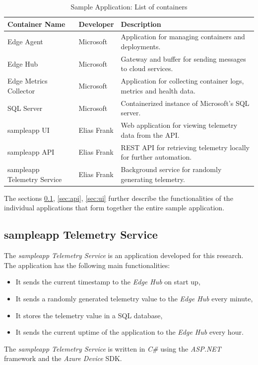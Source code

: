 \begin{table}[H]
    \centering
    \begin{tabular}{ p{} p{} p{}}
        \toprule
        \textbf{Container Name} & \textbf{Developer} & \textbf{Description} \\
        \midrule
        Edge Agent & Microsoft & Application for managing containers and deployments. \\
        Edge Hub & Microsoft & Gateway and buffer for sending messages to cloud services. \\
        Edge Metrics Collector & Microsoft & Application for collecting container logs, metrics and health data. \\
        SQL Server & Microsoft & Containerized instance of Microsoft's SQL server. \\
        sampleapp UI & Elias Frank & Web application for viewing telemetry data from the \ac{API}. \\
        sampleapp API & Elias Frank & \ac{REST} \ac{API} for retrieving telemetry locally for further automation. \\
        sampleapp Telemetry Service & Elias Frank & Background service for randomly generating telemetry. \\
        \bottomrule
    \end{tabular}
    \caption{Sample Application: List of containers}
    \label{tab:containers}
\end{table}



The sections \ref{sec:telemetry-service}, \ref{sec:api}, \ref{sec:ui} further
describe the functionalities of the individual applications that form together
the entire sample application.

\subsection{sampleapp Telemetry Service} \label{sec:telemetry-service}
The \textit{sampleapp Telemetry Service} is an application developed for this
research. The application has the following main functionalities:

\begin{itemize}
    \item It sends the current timestamp to the \textit{Edge Hub} on start up,
    \item It sends a randomly generated telemetry value to the
    \textit{Edge Hub} every minute,
    \item It stores the telemetry value in a \ac{SQL} database,
    \item It sends the current uptime of the application to the \textit{Edge Hub}
    every hour.
\end{itemize}
The \textit{sampleapp Telemetry Service} is written in \textit{C\#} using the
\textit{ASP.NET} framework and the \textit{Azure Device} \ac{SDK}.

